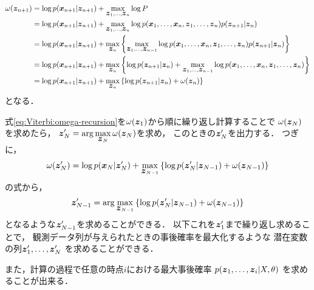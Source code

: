\begin{align}
  \omega(\mbox{\boldmath $z$}_{n+1}) &= \log p(\mbox{\boldmath $x$}_{n+1}|\mbox{\boldmath $z$}_{n+1})+\max_{\mbox{\boldmath $z$}_1,\dots,\mbox{\boldmath $z$}_n}\log P \\
  &= \log p(\mbox{\boldmath $x$}_{n+1}|\mbox{\boldmath $z$}_{n+1})+\max_{\mbox{\boldmath $z$}_1,\dots,\mbox{\boldmath $z$}_n}\log  p(\mbox{\boldmath $x$}_1,\dots,\mbox{\boldmath $x$}_n,\mbox{\boldmath $z$}_1,\dots,\mbox{\boldmath $z$}_n)p(\mbox{\boldmath $z$}_{n+1}|\mbox{\boldmath $z$}_n) \\
  \displaystyle &= \log p(\mbox{\boldmath $x$}_{n+1}|\mbox{\boldmath $z$}_{n+1})+\max_{\mbox{\boldmath $z$}_n}\left\{\max_{\mbox{\boldmath $z$}_1,\dots,\mbox{\boldmath $z$}_{n-1}}\log  p(\mbox{\boldmath $x$}_1,\dots,\mbox{\boldmath $x$}_n,\mbox{\boldmath $z$}_1,\dots,\mbox{\boldmath $z$}_n)p(\mbox{\boldmath $z$}_{n+1}|\mbox{\boldmath $z$}_n)\right\} \\
  \displaystyle &= \log p(\mbox{\boldmath $x$}_{n+1}|\mbox{\boldmath $z$}_{n+1})+\max_{\mbox{\boldmath $z$}_n}\left\{\log p(\mbox{\boldmath $z$}_{n+1}|\mbox{\boldmath $z$}_n)+\max_{\mbox{\boldmath $z$}_1,\dots,\mbox{\boldmath $z$}_{n-1}}\log  p(\mbox{\boldmath $x$}_1,\dots,\mbox{\boldmath $x$}_n,\mbox{\boldmath $z$}_1,\dots,\mbox{\boldmath $z$}_n)\right\} \\
  \displaystyle &= \log p(\mbox{\boldmath $x$}_{n+1}|\mbox{\boldmath $z$}_{n+1})+\max_{\mbox{\boldmath $z$}_n}\left\{\log p(\mbox{\boldmath $z$}_{n+1}|\mbox{\boldmath $z$}_n)+\omega(\mbox{\boldmath $z$}_n)\right\} \label{eq:Viterbi:omega-recursion}\\
\end{align}
となる．

式\eqref{eq:Viterbi:omega-recursion}を$\omega(\mbox{\boldmath $z$}_1)$から順に繰り返し計算することで
$\omega(\mbox{\boldmath $z$}_N)$を求めたら，
$\displaystyle \mbox{\boldmath $z$}_N' = \arg\max_{\mbox{\boldmath $z$}_N}\omega(\mbox{\boldmath $z$}_N)$を求め，
このときの$\mbox{\boldmath $z$}_N'$を出力する．
つぎに，
\begin{align}
  &\omega(\mbox{\boldmath $z$}_N') = \log p(\mbox{\boldmath $x$}_N|\mbox{\boldmath $z$}_N')+\max_{\mbox{\boldmath $z$}_{N-1}}\left\{\log p(\mbox{\boldmath $z$}_N'|\mbox{\boldmath $z$}_{N-1})+\omega(\mbox{\boldmath $z$}_{N-1})\right\} \\
\end{align}
の式から，
\begin{align}
  \mbox{\boldmath $z$}_{N-1}' = \arg\max_{\mbox{\boldmath $z$}_{N-1}}\left\{\log p(\mbox{\boldmath $z$}_N'|\mbox{\boldmath $z$}_{N-1})+\omega(\mbox{\boldmath $z$}_{N-1})\right\}
\end{align}
となるような$\mbox{\boldmath $z$}_{N-1}'$を求めることができる．
以下これを$\mbox{\boldmath $z$}_1'$まで繰り返し求めることで，
観測データ列が与えられたときの事後確率を最大化するような
潜在変数の列$\mbox{\boldmath $z$}_1',\dots,\mbox{\boldmath $z$}_N'$
を求めることができる．

また，計算の過程で任意の時点$i$における最大事後確率
$p(\mbox{\boldmath $z$}_1,\dots,\mbox{\boldmath $z$}_i|X,\theta)$
を求めることが出来る．

